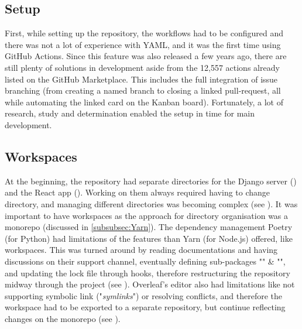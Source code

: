 \documentclass[../main.tex]{subfiles}
\begin{document}
\subsection*{Setup}

First, while setting up the repository, the workflows had to be configured and there was not a lot of experience with YAML, and it was the first time using GitHub Actions. Since this feature was also released a few years ago, there are still plenty of solutions in development aside from the 12,557 actions already listed on the GitHub Marketplace. This includes the full integration of issue branching (from creating a named branch to closing a linked pull-request, all while automating the linked card on the Kanban board). Fortunately, a lot of research, study and determination enabled the setup in time for main development.

\subsection*{Workspaces}

At the beginning, the repository had separate directories for the Django server () and the React app (). Working on them always required having to change directory, and managing different directories was becoming complex (see ). It was important to have workspaces as the approach for directory organisation was a monorepo (discussed in \ref{subsubsec:Yarn}). The dependency management Poetry (for Python) had limitations of the features than Yarn (for Node.js) offered, like workspaces. This was turned around by reading documentations and having discussions on their support channel, eventually defining sub-packages "" \& "", and updating the lock file through hooks, therefore restructuring the repository midway through the project (see ). Overleaf's editor also had limitations like not supporting symbolic link ("\textit{symlinks}") or resolving conflicts, and therefore the  workspace had to be exported to a separate repository, but continue reflecting changes on the monorepo (see ).
\end{document}
